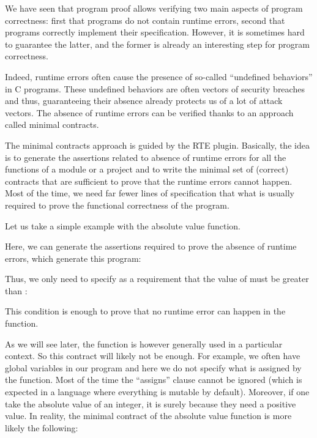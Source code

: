 We have seen that program proof allows verifying two main aspects of program
correctness: first that programs do not contain runtime errors, second that
programs correctly implement their specification. However, it is sometimes hard
to guarantee the latter, and the former is already an interesting step for
program correctness.

Indeed, runtime errors often cause the presence of so-called ``undefined
behaviors'' in C programs. These undefined behaviors are often vectors of
security breaches and thus, guaranteeing their absence already protects us of a
lot of attack vectors. The absence of runtime errors can be verified thanks to
an approach called minimal contracts.




The minimal contracts approach is guided by the RTE plugin. Basically, the idea
is to generate the assertions related to absence of runtime errors for all the
functions of a module or a project and to write the minimal set of (correct)
contracts that are sufficient to prove that the runtime errors cannot happen.
Most of the time, we need far fewer lines of specification that what is usually
required to prove the functional correctness of the program.


Let us take a simple example with the absolute value function.




Here, we can generate the assertions required to prove the absence of runtime
errors, which generate this program:




Thus, we only need to specify as a requirement that the value of 
must be greater than :




This condition is enough to prove that no runtime error can happen in the
function.


As we will see later, the function is however generally used in a particular
context. So this contract will likely not be enough. For
example, we often have global variables in our program and here we do not
specify what is assigned by the function. Most of the time the ``assigns''
clause cannot be ignored (which is expected in a language where everything is
mutable by default). Moreover, if one take the absolute value of an integer,
it is surely because they need a positive value. In reality, the minimal
contract of the absolute value function is more likely the following:


